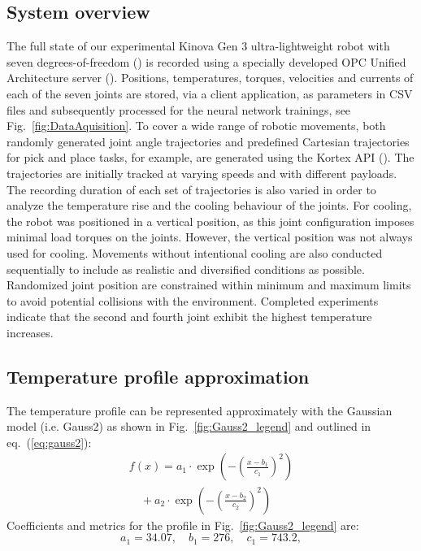 \documentclass{ifacconf}
\begin{document}
\subsection{System overview}
The full state of our experimental Kinova Gen 3 ultra-lightweight robot with seven degrees-of-freedom (\cite{kinova}) is recorded using a specially developed OPC Unified Architecture server (\cite{Girke}). 
Positions, temperatures, torques, velocities and currents of each of the seven joints are stored, via a client application, as parameters in CSV files and subsequently processed for the neural network trainings, see Fig.~\ref{fig:DataAquisition}.
To cover a wide range of robotic movements, both randomly generated joint angle trajectories and predefined Cartesian trajectories for pick and place tasks, for example, are generated using the Kortex API (\cite{kortexAPI}). 
The trajectories are initially tracked at varying speeds and with different payloads. The recording duration of each set of trajectories is also varied in order to analyze the temperature rise and the cooling behaviour of the joints. 
For cooling, the robot was positioned in a vertical position, as this joint configuration imposes minimal load torques on the joints. However, the vertical position was not always used for cooling. Movements without intentional cooling are also conducted sequentially to include as realistic and diversified conditions as possible.
 Randomized joint position are constrained within minimum and maximum limits to avoid potential collisions with the environment. 
Completed experiments indicate that  the second and fourth joint exhibit the highest temperature increases. 

\subsection{Temperature profile approximation}
The temperature profile can be represented approximately with the Gaussian model (i.e. Gauss2) as shown in Fig.~\ref{fig:Gauss2_legend} and outlined in eq.~(\ref{eq:gauss2}):
\begin{equation} \label{eq:gauss2}
  \begin{array}{l}
  f(x) = a_1 \cdot \exp\left( -\left( \frac{x - b_1}{c_1} \right)^2 \right) \\
  \quad + a_2 \cdot \exp\left( -\left( \frac{x - b_2}{c_2} \right)^2 \right)
  \end{array}
  \end{equation}
Coefficients and metrics for the  profile in Fig.~\ref{fig:Gauss2_legend} are:
\[
a_1 = 34.07, \quad b_1 = 276, \quad  c_1 = 743.2,
\]
\end{document}
